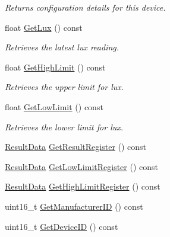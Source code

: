 \begin{DoxyCompactItemize}
\begin{DoxyCompactList}\small\item\em Returns configuration details for this device. \end{DoxyCompactList}\item 
float \hyperlink{classcubesat_1_1OPT3001_a087a57d80f6e3f8d1ba8a0972e30e588}{Get\+Lux} () const
\begin{DoxyCompactList}\small\item\em Retrieves the latest lux reading. \end{DoxyCompactList}\item 
float \hyperlink{classcubesat_1_1OPT3001_a014e0389a3877b2fb4536c925579afd0}{Get\+High\+Limit} () const
\begin{DoxyCompactList}\small\item\em Retrieves the upper limit for lux. \end{DoxyCompactList}\item 
float \hyperlink{classcubesat_1_1OPT3001_acb7a4c2d524e89542598e09d4ba9237d}{Get\+Low\+Limit} () const
\begin{DoxyCompactList}\small\item\em Retrieves the lower limit for lux. \end{DoxyCompactList}\item 
\hyperlink{unioncubesat_1_1OPT3001_1_1ResultData}{Result\+Data} \hyperlink{classcubesat_1_1OPT3001_a0ae711185114bda442826f2afb8e5abe}{Get\+Result\+Register} () const
\item 
\hyperlink{unioncubesat_1_1OPT3001_1_1ResultData}{Result\+Data} \hyperlink{classcubesat_1_1OPT3001_a179490e36d96c976a174cc27ff9c56fe}{Get\+Low\+Limit\+Register} () const
\item 
\hyperlink{unioncubesat_1_1OPT3001_1_1ResultData}{Result\+Data} \hyperlink{classcubesat_1_1OPT3001_a2d6066e4ab634e0c1fa8094ec220be44}{Get\+High\+Limit\+Register} () const
\item 
uint16\+\_\+t \hyperlink{classcubesat_1_1OPT3001_a7d97464978c89d00212fa391e7c700d9}{Get\+Manufacturer\+ID} () const
\item 
uint16\+\_\+t \hyperlink{classcubesat_1_1OPT3001_adc2eb69ceb5e0f3448b06f199d2ec985}{Get\+Device\+ID} () const
\end{DoxyCompactItemize}
